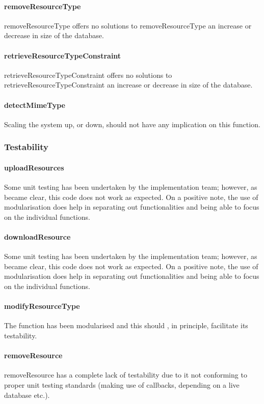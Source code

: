 \documentclass[a4paper]{article}
\begin{document}
\paragraph{removeResourceType}
removeResourceType offers no solutions to removeResourceType an increase or decrease in size of the database.

\paragraph{retrieveResourceTypeConstraint}
retrieveResourceTypeConstraint offers no solutions to retrieveResourceTypeConstraint an increase or decrease in size of the database.

\paragraph{detectMimeType}
Scaling the system up, or down, should not have any implication on this function. 

\subsubsection {Testability}

\paragraph{uploadResources}
Some unit testing has been undertaken by the implementation team; however, as became clear, this code does not work as expected. On a positive note, the use of modularisation does help in separating out functionalities and being able to focus on the individual functions. 

\paragraph{downloadResource}
Some unit testing has been undertaken by the implementation team; however, as became clear, this code does not work as expected. On a positive note, the use of modularisation does help in separating out functionalities and being able to focus on the individual functions. 

\paragraph{modifyResourceType}
The function has been modularised and this should , in principle, facilitate its testability.

\paragraph{removeResource}
removeResource has a complete lack of testability due to it not conforming to proper unit testing standards (making use of callbacks, depending on a live database etc.).
\end{document}

